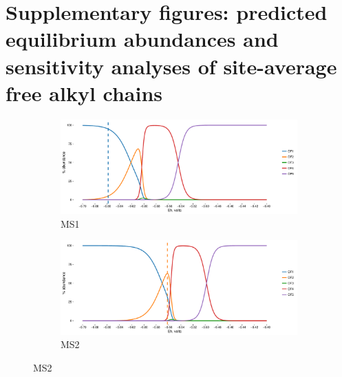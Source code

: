 \chapter{Supplementary figures: predicted equilibrium abundances and sensitivity analyses of site-average free alkyl chains}

\begin{figure}[h]
\centering

    \begin{subfigure}[b]{\linewidth}
       	\includegraphics[width=1\linewidth]{"figs_app2/Mound OF1_thermo"}
       	\caption{MS1}
        \label{fig:MS1_thermo}
    \end{subfigure}
    \begin{subfigure}[b]{\linewidth}
    	\includegraphics[width=1\linewidth]{"figs_app2/Mound OF2_thermo"}
    	\caption{MS2}
        \label{fig:MS2_thermo}
    \end{subfigure}
    
\end{figure}

\newpage


